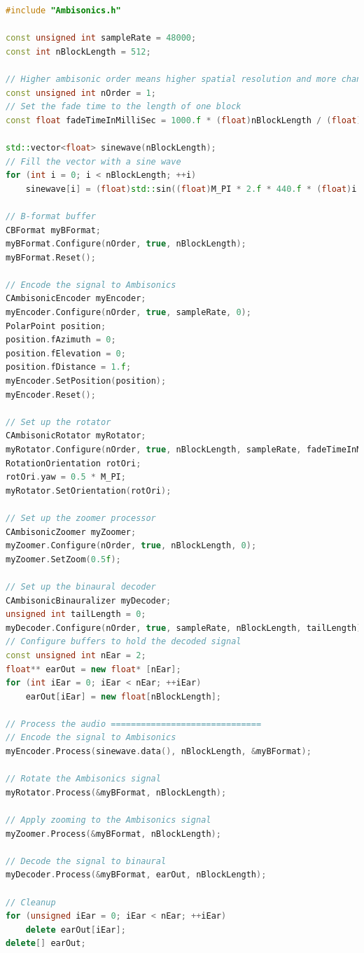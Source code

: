\documentclass[12pt]{report}
\begin{document}
\begin{lstlisting}[language=C++]
#include "Ambisonics.h"

const unsigned int sampleRate = 48000;
const int nBlockLength = 512;

// Higher ambisonic order means higher spatial resolution and more channels required
const unsigned int nOrder = 1;
// Set the fade time to the length of one block
const float fadeTimeInMilliSec = 1000.f * (float)nBlockLength / (float)sampleRate;

std::vector<float> sinewave(nBlockLength);
// Fill the vector with a sine wave
for (int i = 0; i < nBlockLength; ++i)
    sinewave[i] = (float)std::sin((float)M_PI * 2.f * 440.f * (float)i / (float)sampleRate);

// B-format buffer
CBFormat myBFormat;
myBFormat.Configure(nOrder, true, nBlockLength);
myBFormat.Reset();

// Encode the signal to Ambisonics
CAmbisonicEncoder myEncoder;
myEncoder.Configure(nOrder, true, sampleRate, 0);
PolarPoint position;
position.fAzimuth = 0;
position.fElevation = 0;
position.fDistance = 1.f;
myEncoder.SetPosition(position);
myEncoder.Reset();

// Set up the rotator
CAmbisonicRotator myRotator;
myRotator.Configure(nOrder, true, nBlockLength, sampleRate, fadeTimeInMilliSec);
RotationOrientation rotOri;
rotOri.yaw = 0.5 * M_PI;
myRotator.SetOrientation(rotOri);

// Set up the zoomer processor
CAmbisonicZoomer myZoomer;
myZoomer.Configure(nOrder, true, nBlockLength, 0);
myZoomer.SetZoom(0.5f);

// Set up the binaural decoder
CAmbisonicBinauralizer myDecoder;
unsigned int tailLength = 0;
myDecoder.Configure(nOrder, true, sampleRate, nBlockLength, tailLength);
// Configure buffers to hold the decoded signal
const unsigned int nEar = 2;
float** earOut = new float* [nEar];
for (int iEar = 0; iEar < nEar; ++iEar)
    earOut[iEar] = new float[nBlockLength];

// Process the audio ==============================
// Encode the signal to Ambisonics
myEncoder.Process(sinewave.data(), nBlockLength, &myBFormat);

// Rotate the Ambisonics signal
myRotator.Process(&myBFormat, nBlockLength);

// Apply zooming to the Ambisonics signal
myZoomer.Process(&myBFormat, nBlockLength);

// Decode the signal to binaural
myDecoder.Process(&myBFormat, earOut, nBlockLength);

// Cleanup
for (unsigned iEar = 0; iEar < nEar; ++iEar)
    delete earOut[iEar];
delete[] earOut;
\end{lstlisting}
\end{document}
